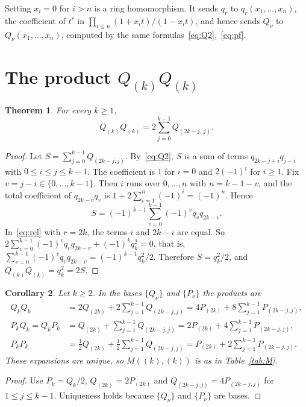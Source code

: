 \documentclass[11pt]{article}
\newtheorem{theorem}{Theorem}
\newtheorem{corollary}[theorem]{Corollary}
\theoremstyle{definition}
\theoremstyle{remark}
\begin{document}
Setting $x_i=0$ for $i>n$ is a ring homomorphism. It sends $q_r$ to $q_r(x_1,\dots,x_n)$,
the coefficient of $t^r$ in $\prod_{i\le n}(1+x_it)/(1-x_it)$, and hence sends $Q_\nu$
to $Q_\nu(x_1,\dots,x_n)$, computed by the same formulas~\eqref{eq:Q2},~\eqref{eq:pf}.

\section{\texorpdfstring{The product $Q_{(k)}Q_{(k)}$}{The product Q(k)Q(k)}}

\begin{theorem}\label{thm:main}
For every $k\ge1$,
\[
Q_{(k)}Q_{(k)} = 2\sum_{j=0}^{k-1}Q_{(2k-j,\,j)} .
\]
\end{theorem}

\begin{proof}
Let $S=\sum_{j=0}^{k-1}Q_{(2k-j,j)}$. By~\eqref{eq:Q2}, $S$ is a sum of terms
$q_{2k-j+i}q_{j-i}$ with $0\le i\le j\le k-1$. The coefficient is $1$ for $i=0$ and
$2(-1)^i$ for $i\ge1$. Fix $v=j-i\in\{0,\dots,k-1\}$. Then $i$ runs over
$0,\dots,n$ with $n=k-1-v$, and the total coefficient of $q_{2k-v}q_v$ is
$1+2\sum_{i=1}^n(-1)^i=(-1)^n$. Hence
\[
S=(-1)^{k-1}\sum_{v=0}^{k-1}(-1)^v q_vq_{2k-v}.
\]
In~\eqref{eq:rel} with $r=2k$, the terms $i$ and $2k-i$ are equal. So
$2\sum_{v=0}^{k-1}(-1)^vq_vq_{2k-v}+(-1)^kq_k^2=0$, that is,
$\sum_{v=0}^{k-1}(-1)^vq_vq_{2k-v}=(-1)^{k-1}q_k^2/2$. Therefore $S=q_k^2/2$, and
$Q_{(k)}Q_{(k)}=q_k^2=2S$.
\end{proof}

\begin{corollary}\label{cor:all}
Let $k\ge2$. In the bases $\{Q_\nu\}$ and $\{P_\nu\}$ the products are
\begin{align*}
Q_kQ_k &= 2Q_{(2k)}+2\textstyle\sum_{j=1}^{k-1}Q_{(2k-j,j)}
        = 4P_{(2k)}+8\textstyle\sum_{j=1}^{k-1}P_{(2k-j,j)},\\
P_kQ_k=Q_kP_k &= Q_{(2k)}+\textstyle\sum_{j=1}^{k-1}Q_{(2k-j,j)}
        = 2P_{(2k)}+4\textstyle\sum_{j=1}^{k-1}P_{(2k-j,j)},\\
P_kP_k &= \tfrac12 Q_{(2k)}+\tfrac12\textstyle\sum_{j=1}^{k-1}Q_{(2k-j,j)}
        = P_{(2k)}+2\textstyle\sum_{j=1}^{k-1}P_{(2k-j,j)}.
\end{align*}
These expansions are unique, so $M((k),(k))$ is as in Table~\ref{tab:M}.
\end{corollary}

\begin{proof}
Use $P_k=Q_k/2$, $Q_{(2k)}=2P_{(2k)}$ and $Q_{(2k-j,j)}=4P_{(2k-j,j)}$ for $1\le j\le k-1$.
Uniqueness holds because $\{Q_\nu\}$ and $\{P_\nu\}$ are bases.
\end{proof}
\end{document}
